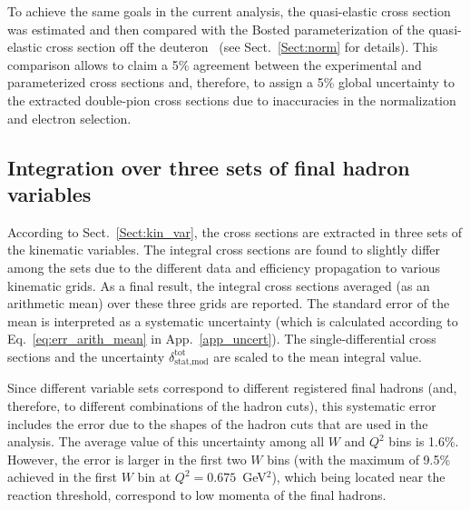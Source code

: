 To achieve the same goals in the current analysis, the quasi-elastic cross section was estimated and then compared with the Bosted  parameterization of the quasi-elastic cross section off the deuteron~\cite{Bosted_fit,Bosted:2007xd} (see Sect.~\ref{Sect:norm} for details). This comparison allows to claim a 5\% agreement between the experimental and parameterized cross sections and, therefore, to assign a 5\% global uncertainty to the extracted double-pion cross sections due to inaccuracies in the normalization and electron selection.




\subsection*{Integration over three sets of final hadron variables}

According to Sect.~\ref{Sect:kin_var}, the cross sections are extracted in three sets of the kinematic variables. The integral cross sections are found to slightly differ among the sets due to the different data and efficiency propagation to various kinematic grids. As a final result, the integral cross sections averaged (as an arithmetic mean) over these three grids are reported. The standard error of the mean is interpreted as a systematic uncertainty (which is calculated according to Eq.~\eqref{eq:err_arith_mean} in App.~\ref{app_uncert}). The single-differential cross sections and the uncertainty $\delta_{\text{stat,mod}}^{\text{tot}}$ are scaled to the mean integral value. 

Since different variable sets correspond to different registered final hadrons (and, therefore, to different combinations of the hadron cuts), this systematic error includes the error due to the shapes of the hadron cuts that are used in the analysis. The average value of this uncertainty among all $W$ and $Q^{2}$ bins is 1.6\%. However, the error is larger in the first two $W$ bins (with the maximum of 9.5\% achieved in the first $W$ bin at $Q^{2} = 0.675$~GeV$^{2}$), which being located near the reaction threshold, correspond to low momenta of the final hadrons.  

